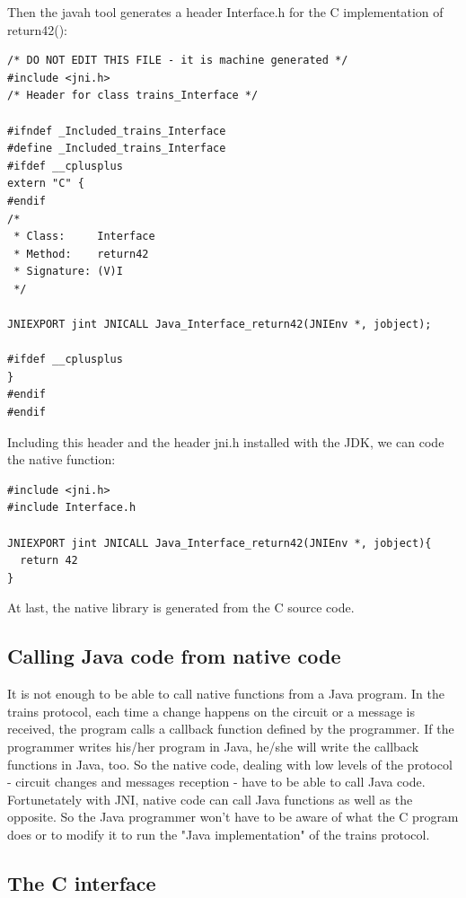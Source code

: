 \documentclass[a4paper,10pt]{report}
\begin{document}
Then the javah tool generates a header Interface.h for the C implementation of return42():\\
\lstset{language=C}
\lstset{commentstyle=\textit} 
\begin{lstlisting}
/* DO NOT EDIT THIS FILE - it is machine generated */
#include <jni.h>
/* Header for class trains_Interface */

#ifndef _Included_trains_Interface
#define _Included_trains_Interface
#ifdef __cplusplus
extern "C" {
#endif
/*
 * Class:     Interface
 * Method:    return42
 * Signature: (V)I
 */

JNIEXPORT jint JNICALL Java_Interface_return42(JNIEnv *, jobject);

#ifdef __cplusplus
}
#endif
#endif
\end{lstlisting}

Including this header and the header jni.h installed with the JDK, we can code the native function:\\

\lstset{language=C}
\lstset{commentstyle=\textit} 
\begin{lstlisting}
#include <jni.h>
#include Interface.h

JNIEXPORT jint JNICALL Java_Interface_return42(JNIEnv *, jobject){
  return 42
}

\end{lstlisting}

At last, the native library is generated from the C source code.

\subsection{Calling Java code from native code}

It is not enough to be able to call native functions from a Java program. In the trains protocol, each time a change happens on the circuit
or a message is received, the program calls a callback function defined by the programmer.
If the programmer writes his/her program in Java, he/she will write the callback functions in Java, too. So the native code, dealing with
low levels of the protocol - circuit changes and messages reception - have to be able to call Java code.
Fortunetately with JNI, native code can call Java functions as well as the opposite. So the Java programmer won't have to be aware of
what the C program does or to modify it to run the "Java implementation" of the trains protocol.  

\subsection{The C interface}
\end{document}
